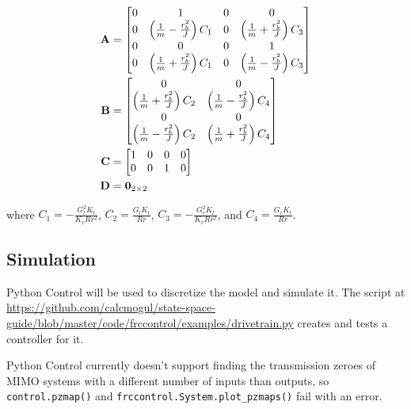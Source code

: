 \begin{align}
  \mathbf{A} &=
  \begin{bmatrix}
    0 & 1 & 0 & 0 \\
    0 & \left(\frac{1}{m} - \frac{r_b^2}{J}\right) C_1 & 0 & \left(\frac{1}{m} + \frac{r_b^2}{J}\right) C_3 \\
    0 & 0 & 0 & 1 \\
    0 & \left(\frac{1}{m} + \frac{r_b^2}{J}\right) C_1 & 0 & \left(\frac{1}{m} - \frac{r_b^2}{J}\right) C_3
  \end{bmatrix} \\
  \mathbf{B} &=
  \begin{bmatrix}
    0 & 0 \\
    \left(\frac{1}{m} + \frac{r_b^2}{J}\right) C_2 & \left(\frac{1}{m} - \frac{r_b^2}{J}\right) C_4 \\
    0 & 0 \\
    \left(\frac{1}{m} - \frac{r_b^2}{J}\right) C_2 & \left(\frac{1}{m} + \frac{r_b^2}{J}\right) C_4
  \end{bmatrix} \\
  \mathbf{C} &=
  \begin{bmatrix}
    1 & 0 & 0 & 0 \\
    0 & 0 & 1 & 0 \\
  \end{bmatrix} \\
  \mathbf{D} &= \mathbf{0}_{2 \times 2}
\end{align}

where $C_1 = -\frac{G_l^2 K_t}{K_v R r^2}$, $C_2 = \frac{G_l K_t}{Rr}$,
$C_3 = -\frac{G_r^2 K_t}{K_v R r^2}$, and $C_4 = \frac{G_r K_t}{Rr}$.

\subsection{Simulation}

Python Control will be used to discretize the model and simulate it. The script
at
\url{https://github.com/calcmogul/state-space-guide/blob/master/code/frccontrol/examples/drivetrain.py}
creates and tests a controller for it.

\begin{remark}
  Python Control currently doesn't support finding the transmission zeroes of
  MIMO systems with a different number of inputs than outputs, so
  \texttt{control.pzmap()} and \texttt{frccontrol.System.plot\_pzmaps()} fail
  with an error.
\end{remark}
